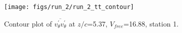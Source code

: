 \begin{figure}[H]
\centering
\texttt{[image: figs/run\_2/run\_2\_tt\_contour]}
\caption{Contour plot of $\overline{v_{\theta}^{\prime} v_{\theta}^{\prime}}$ at $z/c$=5.37, $V_{free}$=16.88, station 1.}
\label{fig:run_2_tt_contour}
\end{figure}


